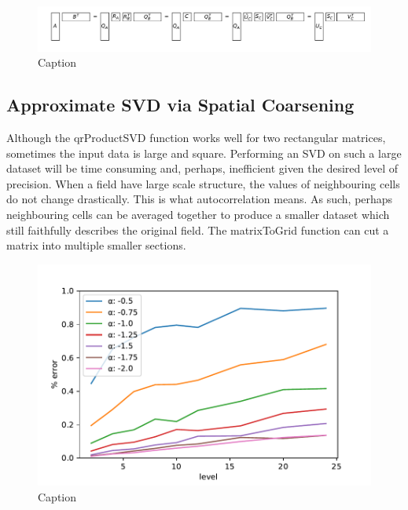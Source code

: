 \documentclass{acm_proc_article-sp}
\begin{document}
\begin{figure}[h]
\begin{center}
\includegraphics[scale=0.25]{Results/qrProductSVD.pdf}
\caption[Small caption]{Caption}
\label{fig:qrProductSVD}
\end{center}
\end{figure}

\subsection{Approximate SVD via Spatial Coarsening}
\label{sec:Techniques Approximate SVD via Spatial Coarsening}

Although the qrProductSVD function works well for two rectangular matrices, sometimes the input data is large and square. Performing an SVD on such a large dataset will be time consuming and, perhaps, inefficient given the desired level of precision. When a field have large scale structure, the values of neighbouring cells do not change drastically. This is what autocorrelation means. As such, perhaps neighbouring cells can be averaged together to produce a smaller dataset which still faithfully describes the original field. The matrixToGrid function can cut a matrix into multiple smaller sections.

\begin{figure}[h]
\begin{center}
\includegraphics[scale=0.5]{Results/plotSingleSpatialFieldViaCoarsening.pdf}
\caption[Small caption]{Caption}
\label{fig:plotSingleSpatialFieldViaCoarsening}
\end{center}
\end{figure}
\end{document}
